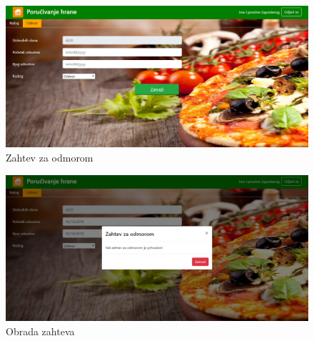  \begin{figure}[ht]
    \leavevmode
    \begin{center}
    \includegraphics[height=0.3\textheight]{slike/odmor.png}
    \end{center}
    \caption{Zahtev za odmorom} %
    \label{fig:slika_odmor}
\end{figure}

 \begin{figure}[!h]
    \leavevmode
    \begin{center}
    \includegraphics[height=0.3\textheight]{slike/odmor1.png}
    \end{center}
    \caption{Obrada zahteva} %
    \label{fig:slika_obrada1}
\end{figure}
 
